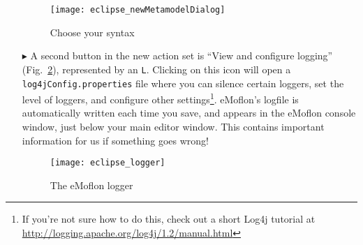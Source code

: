 \begin{itemize}
\begin{figure}[htbp]
	\centering
  \texttt{[image: eclipse\_newMetamodelDialog]}
	\caption{Choose your syntax}
	\label{fig_chooseSyntax}
\end{figure} 

\item[$\blacktriangleright$]  A second button in the new action set is ``View and configure logging'' (Fig.~\ref{fig_logger}), represented by an \texttt{L}.
Clicking on this icon will open a \texttt{log4jConfig.properties} file where you can silence certain loggers, set the level of loggers, and configure other
settings\footnote{If you're not sure how to do this, check out a short Log4j tutorial at
\href{http://logging.apache.org/log4j/1.2/manual.html}{http://logging.apache.org/log4j/1.2/manual.html}}. eMoflon's logfile is automatically written each time
you save, and appears in the eMoflon console window, just below your main editor window. This contains important information for us if something goes wrong!

\newpage
\vspace*{3cm}
\begin{figure}[htbp]
	\centering
  \texttt{[image: eclipse\_logger]}
	\caption{The eMoflon logger}
	\label{fig_logger}
\end{figure} 
\end{itemize}





